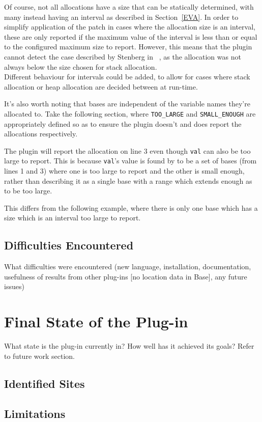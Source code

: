 Of course, not all allocations have a size that can be statically determined, with many instead having an interval as described in Section~\ref{EVA}. In order to simplify application of the patch in cases where the allocation size is an interval, these are only reported if the maximum value of the interval is less than or equal to the configured maximum size to report. However, this means that the plugin cannot detect the case described by Stenberg in ~\cite{curlmalloc}, as the allocation was not always below the size chosen for stack allocation.\\
Different behaviour for intervals could be added, to allow for cases where stack allocation or heap allocation are decided between at run-time.

It's also worth noting that bases are independent of the variable names they're allocated to. Take the following section, where \texttt{TOO\_LARGE} and \texttt{SMALL\_ENOUGH} are appropriately defined so as to ensure the plugin doesn't and does report the allocations respectively.



The plugin will report the allocation on line 3 even though \texttt{val} can also be too large to report. This is because \texttt{val}'s value is found by  to be a set of bases (from lines 1 and 3) where one is too large to report and the other is small enough, rather than describing it as a single base with a range which extends enough as to be too large.

This differs from the following example, where there is only one base which has a size which is an interval too large to report.



\subsection{Difficulties Encountered}

What difficulties were encountered (new language, installation, documentation, usefulness of results from other plug-ins [no location data in Base], any future issues)

\section{Final State of the Plug-in}

What state is the plug-in currently in? How well has it achieved its goals? Refer to future work section.

\subsection{Identified Sites}

\subsection{Limitations}
